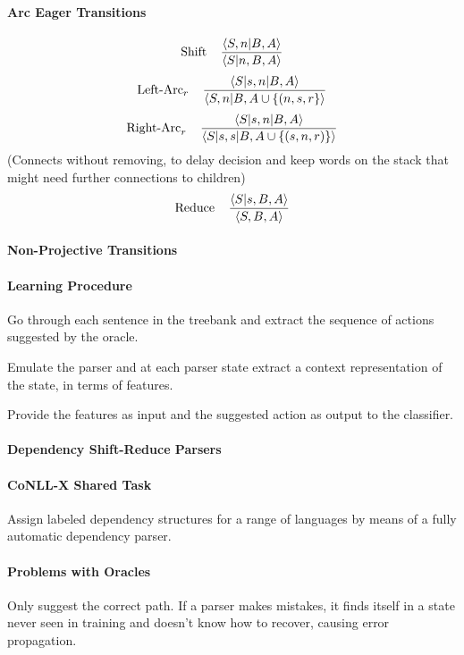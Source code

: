 \documentclass[10pt]{report}
\begin{document}
\paragraph{Arc Eager Transitions}
$$\hbox{Shift}\:\:\:\:\:\frac{\langle S, n|B, A\rangle}{\langle S|n, B, A\rangle}$$
$$\hbox{Left-Arc}_r\:\:\:\:\:\frac{\langle S|s, n|B, A\rangle}{\langle S, n|B, A\cup\{(n, s, r\}\rangle}$$
$$\hbox{Right-Arc}_r\:\:\:\:\:\frac{\langle S|s, n|B, A\rangle}{\langle S|s, s|B, A\cup\{(s,n,r)\}\rangle}$$
(Connects without removing, to delay decision and keep words on the stack that might need further connections to children)
$$\hbox{Reduce}\:\:\:\:\:\frac{\langle S|s, B, A\rangle}{\langle S, B, A\rangle}$$
\paragraph{Non-Projective Transitions} \begin{list}{}{}
	\item 
\end{list}
\paragraph{Learning Procedure}
\begin{list}{}{}
	\item Go through each sentence in the treebank and extract the sequence of actions suggested by the oracle.
	\item Emulate the parser and at each parser state extract a context representation of the state, in terms of features.
	\item Provide the features as input and the suggested action as output to the classifier.
\end{list}
\paragraph{Dependency Shift-Reduce Parsers}
\paragraph{CoNLL-X Shared Task} Assign labeled dependency structures for a range of languages by means of a fully automatic dependency parser.
\paragraph{Problems with Oracles} Only suggest the correct path. If a parser makes mistakes, it finds itself in a state never seen in training and doesn't know how to recover, causing error propagation.
\end{document}
